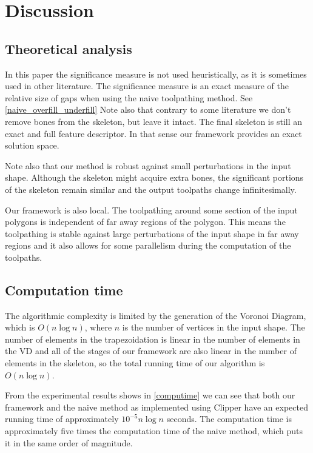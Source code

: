 \section{Discussion}

\subsection{Theoretical analysis}
In this paper the significance measure is not used heuristically, as it is sometimes used in other literature.
The significance measure is an exact measure of the relative size of gaps when using the naive toolpathing method.
See \cref{naive_overfill_underfill}
Note also that contrary to some literature we don't remove bones from the skeleton, but leave it intact.
The final skeleton is still an exact and full feature descriptor.
In that sense our framework provides an exact solution space.

Note also that our method is robust against small perturbations in the input shape.
Although the skeleton might acquire extra bones, the significant portions of the skeleton remain similar and the output toolpaths change infinitesimally.

Our framework is also local.
The toolpathing around some section of the input polygons is independent of far away regions of the polygon.
This means the toolpathing is stable against large perturbations of the input shape in far away regions
and it also allows for some parallelism during the computation of the toolpaths.


\subsection{Computation time}
The algorithmic complexity is limited by the generation of the Voronoi Diagram, which is $O(n \log n)$, where $n$ is the number of vertices in the input shape.
The number of elements in the trapezoidation is linear in the number of elements in the VD
and all of the stages of our framework are also linear in the number of elements in the skeleton,
so the total running time of our algorithm is $O(n \log n)$.

From the experimental results shows in \cref{computime} we can see that both our framework and the naive method as implemented using Clipper have an expected running time of approximately $10^{-5} n \log n$ seconds.
The computation time is approximately five times the computation time of the naive method, which puts it in the same order of magnitude.




